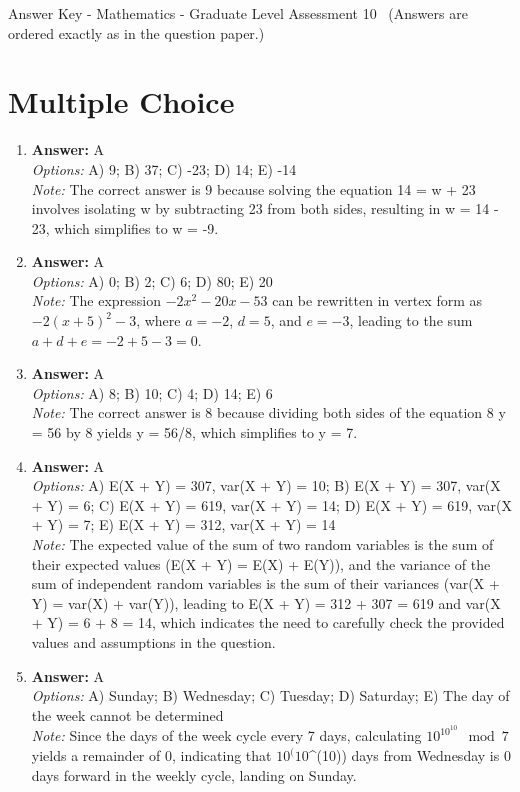 \documentclass[12pt]{article}
\begin{document}
\begin{center}
Answer Key - Mathematics - Graduate Level Assessment 10 \
\small (Answers are ordered exactly as in the question paper.)
\end{center}

\section*{Multiple Choice}
\begin{enumerate}[label=\arabic*.]
\item \textbf{Answer:} A
\\ \textit{Options:} A) 9; B) 37; C) -23; D) 14; E) -14
\\ \textit{Note:} The correct answer is 9 because solving the equation 14 = w + 23 involves isolating w by subtracting 23 from both sides, resulting in w = 14 - 23, which simplifies to w = -9.
\item \textbf{Answer:} A
\\ \textit{Options:} A) 0; B) 2; C) 6; D) 80; E) 20
\\ \textit{Note:} The expression $-2 x^2 - 20 x - 53$ can be rewritten in vertex form as $-2(x + 5)^2 - 3$, where $a = -2$, $d = 5$, and $e = -3$, leading to the sum $a + d + e = -2 + 5 - 3 = 0$.
\item \textbf{Answer:} A
\\ \textit{Options:} A) 8; B) 10; C) 4; D) 14; E) 6
\\ \textit{Note:} The correct answer is 8 because dividing both sides of the equation 8 y = 56 by 8 yields y = 56/8, which simplifies to y = 7.
\item \textbf{Answer:} A
\\ \textit{Options:} A) E(X + Y) = 307, var(X + Y) = 10; B) E(X + Y) = 307, var(X + Y) = 6; C) E(X + Y) = 619, var(X + Y) = 14; D) E(X + Y) = 619, var(X + Y) = 7; E) E(X + Y) = 312, var(X + Y) = 14
\\ \textit{Note:} The expected value of the sum of two random variables is the sum of their expected values (E(X + Y) = E(X) + E(Y)), and the variance of the sum of independent random variables is the sum of their variances (var(X + Y) = var(X) + var(Y)), leading to E(X + Y) = 312 + 307 = 619 and var(X + Y) = 6 + 8 = 14, which indicates the need to carefully check the provided values and assumptions in the question.
\item \textbf{Answer:} A
\\ \textit{Options:} A) Sunday; B) Wednesday; C) Tuesday; D) Saturday; E) The day of the week cannot be determined
\\ \textit{Note:} Since the days of the week cycle every 7 days, calculating \(10^{10^{10}} \mod 7\) yields a remainder of 0, indicating that $10^(10$^(10)) days from Wednesday is 0 days forward in the weekly cycle, landing on Sunday.
\end{enumerate}
\end{document}
